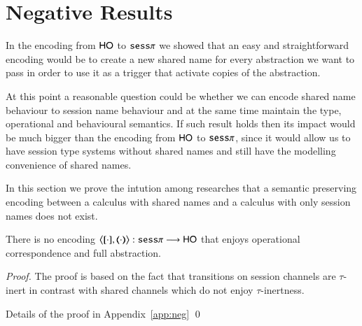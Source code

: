 \section{Negative Results}

In the encoding from $\mathsf{HO}$ to $\mathtt{sess}\pi$ we showed that
an easy and straightforward encoding would be to create
a new shared name for every abstraction we want to pass
in order to use it as a trigger that activate copies of
the abstraction.

At this point a reasonable question could be whether we can
encode shared name behaviour to session name behaviour and at
the same time maintain the type, operational and behavioural semantics.
If such result holds then its impact would be much bigger than
the encoding from $\mathsf{HO}$ to $\mathtt{sess}\pi$, since it would
allow us to have session type systems without shared names
and still have the modelling convenience of shared names.

In this section we prove the intution among researches 
that a semantic preserving encoding between a calculus
with shared names and a calculus with only session names
does not exist.

\begin{theorem}\rm
	There is no encoding $\enc{\cdot}{\cdot}: \sesp \longrightarrow \HO$
	that enjoys operational correspondence and full abstraction.
\end{theorem}

\begin{proof}
	The proof is based on the fact that
	transitions on session channels are
	$\tau$-inert in contrast with shared
	channels which do not enjoy
	$\tau$-inertness.

	Details of the proof in Appendix~\ref{app:neg}
	\qed
\end{proof}
